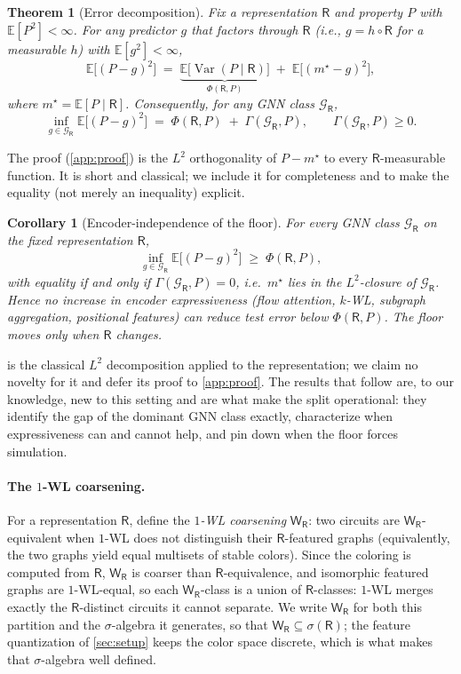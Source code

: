 \documentclass[10pt]{article}
\newtheorem{theorem}{Theorem}
\newtheorem{corollary}{Corollary}
\newcommand{\E}{\mathbb{E}}
\newcommand{\Var}{\operatorname{Var}}
\newcommand{\R}{\mathsf{R}}
\newcommand{\Gcal}{\mathcal{G}}
\newcommand{\W}{\mathsf{W}}
\begin{document}
\begin{theorem}[Error decomposition]
\label{thm:decomp}
Fix a representation $\R$ and property $P$ with $\E[P^2]<\infty$. For any predictor $g$ that factors through $\R$ (i.e., $g=h\circ\R$ for a measurable $h$) with $\E[g^2]<\infty$,
\begin{equation}
\E\!\big[(P-g)^2\big] \;=\; \underbrace{\E\!\big[\Var(P\mid \R)\big]}_{\Phi(\R,P)} \;+\; \E\!\big[(m^\star-g)^2\big],
\label{eq:pyth}
\end{equation}
where $m^\star=\E[P\mid\R]$. Consequently, for any GNN class $\Gcal_\R$,
\begin{equation}
\inf_{g\in\Gcal_\R}\E\!\big[(P-g)^2\big] \;=\; \Phi(\R,P) \;+\; \Gamma(\Gcal_\R,P),
\qquad \Gamma(\Gcal_\R,P)\ge 0 .
\label{eq:infdecomp}
\end{equation}
\end{theorem}

\noindent The proof (\cref{app:proof}) is the $L^2$ orthogonality of $P-m^\star$ to every $\R$-measurable function. It is short and classical; we include it for completeness and to make the equality (not merely an inequality) explicit.

\begin{corollary}[Encoder-independence of the floor]
\label{cor:indep}
For every GNN class $\Gcal_\R$ on the fixed representation $\R$,
\[
\inf_{g\in\Gcal_\R}\E\!\big[(P-g)^2\big] \;\ge\; \Phi(\R,P),
\]
with equality if and only if $\Gamma(\Gcal_\R,P)=0$, i.e.\ $m^\star$ lies in the $L^2$-closure of $\Gcal_\R$. Hence no increase in encoder expressiveness (flow attention, $k$-WL, subgraph aggregation, positional features) can reduce test error below $\Phi(\R,P)$. The floor moves only when $\R$ changes.
\end{corollary}

 is the classical $L^2$ decomposition applied to the representation; we claim no novelty for it and defer its proof to \cref{app:proof}. The results that follow are, to our knowledge, new to this setting and are what make the split operational: they identify the gap of the dominant GNN class exactly, characterize when expressiveness can and cannot help, and pin down when the floor forces simulation.

\paragraph{The $1$-WL coarsening.} For a representation $\R$, define the \emph{$1$-WL coarsening} $\W_\R$: two circuits are $\W_\R$-equivalent when $1$-WL does not distinguish their $\R$-featured graphs (equivalently, the two graphs yield equal multisets of stable colors). Since the coloring is computed from $\R$, $\W_\R$ is coarser than $\R$-equivalence, and isomorphic featured graphs are $1$-WL-equal, so each $\W_\R$-class is a union of $\R$-classes: $1$-WL merges exactly the $\R$-distinct circuits it cannot separate. We write $\W_\R$ for both this partition and the $\sigma$-algebra it generates, so that $\W_\R\subseteq\sigma(\R)$; the feature quantization of \cref{sec:setup} keeps the color space discrete, which is what makes that $\sigma$-algebra well defined.
\end{document}
